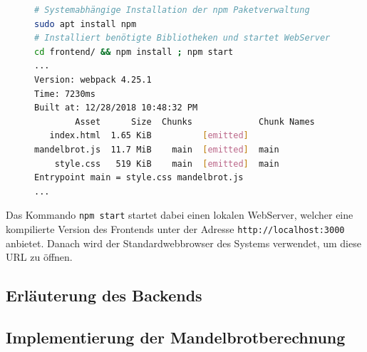 \begin{figure}[h!]
	\begin{lstlisting}[language=bash, caption={Starten des Frontends mit beispielhafter Ausgabe}]
# Systemabhängige Installation der npm Paketverwaltung
sudo apt install npm
# Installiert benötigte Bibliotheken und startet WebServer
cd frontend/ && npm install ; npm start
...
Version: webpack 4.25.1
Time: 7230ms
Built at: 12/28/2018 10:48:32 PM
        Asset      Size  Chunks             Chunk Names
   index.html  1.65 KiB          [emitted]
mandelbrot.js  11.7 MiB    main  [emitted]  main
    style.css   519 KiB    main  [emitted]  main
Entrypoint main = style.css mandelbrot.js
...
        \end{lstlisting}
\end{figure}

Das Kommando \verb|npm start| startet dabei einen lokalen WebServer, welcher eine kompilierte Version des Frontends
unter der Adresse \verb|http://localhost:3000| anbietet. Danach wird der Standardwebbrowser des Systems verwendet, um diese
URL zu öffnen.



\subsection{Erläuterung des Backends}

\subsection{Implementierung der Mandelbrotberechnung}

